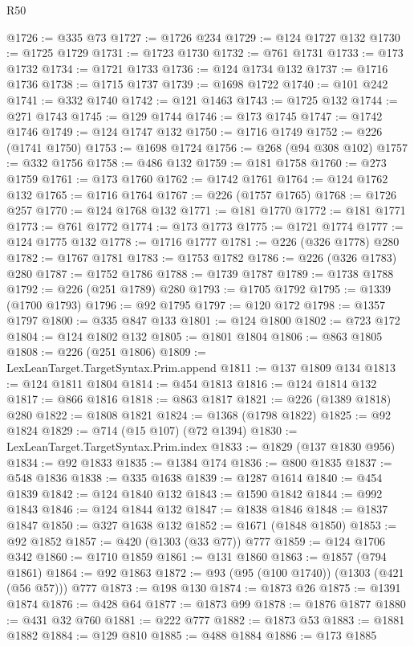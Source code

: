 \begin{lexlean}{R50}
\begin{coremodule}
{{{{{{{{{{{{{{{{{{{{{{{{{{{{{{{{{{{{{{{{{{{{{{{{{{{{{{{{{{{{@1726 := @335 @73
@1727 := @1726 @234
@1729 := @124 @1727 @132
@1730 := @1725 @1729
@1731 := @1723 @1730
@1732 := @761 @1731
@1733 := @173 @1732
@1734 := @1721 @1733
@1736 := @124 @1734 @132
@1737 := @1716 @1736
@1738 := @1715 @1737
@1739 := @1698 @1722
@1740 := @101 @242
@1741 := @332 @1740
@1742 := @121 @1463
@1743 := @1725 @132
@1744 := @271 @1743
@1745 := @129 @1744
@1746 := @173 @1745
@1747 := @1742 @1746
@1749 := @124 @1747 @132
@1750 := @1716 @1749
@1752 := @226 (@1741 @1750)
@1753 := @1698 @1724
@1756 := @268 (@94 @308 @102)
@1757 := @332 @1756
@1758 := @486 @132
@1759 := @181 @1758
@1760 := @273 @1759
@1761 := @173 @1760
@1762 := @1742 @1761
@1764 := @124 @1762 @132
@1765 := @1716 @1764
@1767 := @226 (@1757 @1765)
@1768 := @1726 @257
@1770 := @124 @1768 @132
@1771 := @181 @1770
@1772 := @181 @1771
@1773 := @761 @1772
@1774 := @173 @1773
@1775 := @1721 @1774
@1777 := @124 @1775 @132
@1778 := @1716 @1777
@1781 := @226 (@326 @1778) @280
@1782 := @1767 @1781
@1783 := @1753 @1782
@1786 := @226 (@326 @1783) @280
@1787 := @1752 @1786
@1788 := @1739 @1787
@1789 := @1738 @1788
@1792 := @226 (@251 @1789) @280
@1793 := @1705 @1792
@1795 := @1339 (@1700 @1793)
@1796 := @92 @1795
@1797 := @120 @172
@1798 := @1357 @1797
@1800 := @335 @847 @133
@1801 := @124 @1800
@1802 := @723 @172
@1804 := @124 @1802 @132
@1805 := @1801 @1804
@1806 := @863 @1805
@1808 := @226 (@251 @1806)
@1809 := LexLeanTarget.TargetSyntax.Prim.append
@1811 := @137 @1809 @134
@1813 := @124 @1811 @1804
@1814 := @454 @1813
@1816 := @124 @1814 @132
@1817 := @866 @1816
@1818 := @863 @1817
@1821 := @226 (@1389 @1818) @280
@1822 := @1808 @1821
@1824 := @1368 (@1798 @1822)
@1825 := @92 @1824
@1829 := @714 (@15 @107) (@72 @1394)
@1830 := LexLeanTarget.TargetSyntax.Prim.index
@1833 := @1829 (@137 @1830 @956)
@1834 := @92 @1833
@1835 := @1384 @174
@1836 := @800 @1835
@1837 := @548 @1836
@1838 := @335 @1638
@1839 := @1287 @1614
@1840 := @454 @1839
@1842 := @124 @1840 @132
@1843 := @1590 @1842
@1844 := @992 @1843
@1846 := @124 @1844 @132
@1847 := @1838 @1846
@1848 := @1837 @1847
@1850 := @327 @1638 @132
@1852 := @1671 (@1848 @1850)
@1853 := @92 @1852
@1857 := @420 (@1303 (@33 @77)) @777
@1859 := @124 @1706 @342
@1860 := @1710 @1859
@1861 := @131 @1860
@1863 := @1857 (@794 @1861)
@1864 := @92 @1863
@1872 := @93 (@95 (@100 @1740)) (@1303 (@421 (@56 @57))) @777
@1873 := @198 @130
@1874 := @1873 @26
@1875 := @1391 @1874
@1876 := @428 @64
@1877 := @1873 @99
@1878 := @1876 @1877
@1880 := @431 @32 @760
@1881 := @222 @777
@1882 := @1873 @53
@1883 := @1881 @1882
@1884 := @129 @810
@1885 := @488 @1884
@1886 := @173 @1885
}}}}}}}}}}}}}}}}}}}}}}}}}}}}}}}}}}}}}}}}}}}}}}}}}}}}}}}}}}}}
\end{coremodule}
\end{lexlean}
